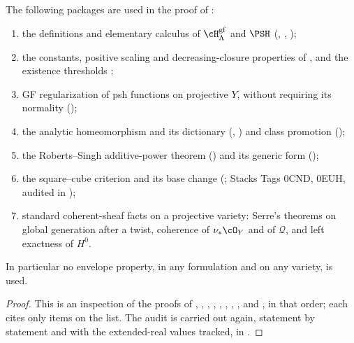 \begin{proposition}
\label{prop:ch44-ledger}
The following packages are used in the proof of
:
\begin{enumerate}
\item the definitions and elementary calculus of
      $\cH^{\mathrm{gf}}_\Lambda$ and $\PSH$
      (, ,
      );
\item the constants, positive scaling and decreasing-closure properties
      of , and
      the existence thresholds ;
\item GF regularization of psh functions on projective $Y$, without
      requiring its normality ();
\item the analytic homeomorphism and its dictionary
      (,
      ) and class promotion
      ();
\item the Roberts--Singh additive-power theorem
      () and its generic form
      ();
\item the square--cube criterion and its base change
      (; Stacks Tags 0CND, 0EUH, audited in
      );
\item standard coherent-sheaf facts on a projective variety: Serre's
      theorems on global generation after a twist, coherence of
      $\nu_*\cO_Y$ and of $\mathcal Q$, and left exactness of
      $H^0$.
\end{enumerate}
In particular no envelope property, in any formulation and on any variety,
is used.
\end{proposition}

\begin{proof}
This is an inspection of the proofs of
,
,
,
,
,
,
,
,
 and
, in that order; each cites only
items on the list.  The audit is carried out again, statement by statement
and with the extended-real values tracked, in .
\end{proof}

